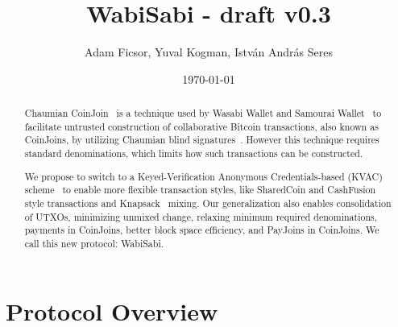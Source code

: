 \documentclass{article}
\title{WabiSabi - draft v0.3}
\author{Adam Ficsor, Yuval Kogman, István András Seres}
\date{\today}
\begin{document}
\maketitle

\begin{abstract}


Chaumian CoinJoin~\cite{mizrahi2013blind}\cite{maxwell2013coinjoin} is a technique used by Wasabi Wallet and Samourai Wallet~\cite{zerolink} to facilitate untrusted construction of collaborative Bitcoin transactions, also known as CoinJoins, by utilizing Chaumian blind signatures~\cite{chaum1983blind}. However this technique requires standard denominations, which limits how such transactions can be constructed.

We propose to switch to a Keyed-Verification Anonymous Credentials-based (KVAC) scheme~\cite{chase2019signal} to enable more flexible transaction styles, like SharedCoin and CashFusion~\cite{cashfusion} style transactions and Knapsack~\cite{maurer2017anonymous} mixing. Our generalization also enables consolidation of UTXOs, minimizing unmixed change, relaxing minimum required denominations, payments in CoinJoins, better block space efficiency, and PayJoins in CoinJoins. We call this new protocol: WabiSabi.

\end{abstract}




\section{Protocol Overview}
\end{document}
